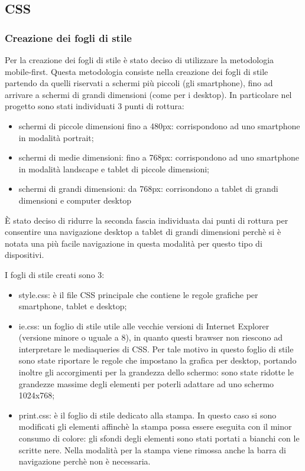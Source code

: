 \subsection{CSS}
\subsubsection{Creazione dei fogli di stile}

Per la creazione dei fogli di stile è stato deciso di utilizzare la metodologia mobile-first.
Questa metodologia consiste nella creazione dei fogli di stile partendo da quelli riservati a schermi più piccoli (gli smartphone), fino ad arrivare a schermi di grandi dimensioni (come per i desktop).
In particolare nel progetto sono stati individuati 3 punti di rottura:
\begin{itemize}

    \item schermi di piccole dimensioni fino a 480px: corrispondono ad uno smartphone in modalità portrait;
    \item schermi di medie dimensioni: fino a 768px: corrispondono ad uno smartphone in modalità landscape e tablet di piccole dimensioni;
    \item schermi di grandi dimensioni: da 768px: corrisondono a tablet di grandi dimensioni e computer desktop

\end{itemize}

\`E stato deciso di ridurre la seconda fascia individuata dai punti di rottura per consentire una navigazione desktop a tablet di grandi dimensioni perchè si è notata una più facile navigazione in questa modalità per questo tipo di dispositivi.

I fogli di stile creati sono 3:
\begin{itemize}

    \item style.css: è il file CSS principale che contiene le regole grafiche per smartphone, tablet e desktop;
    \item ie.css:  un foglio di stile utile alle vecchie versioni di Internet Explorer (versione minore o uguale a 8), in quanto questi brawser non riescono ad interpretare le mediaqueries di CSS. Per tale motivo in questo foglio di stile sono state riportare le regole che impostano la grafica per desktop, portando inoltre gli accorgimenti per la grandezza dello schermo: sono state ridotte le grandezze massime degli elementi per poterli adattare ad uno schermo 1024x768;
    \item print.css: è il foglio di stile dedicato alla stampa. In questo caso si sono modificati gli elementi affinchè la stampa possa essere eseguita con il minor consumo di colore: gli sfondi degli elementi sono stati portati a bianchi con le scritte nere. Nella modalità per la stampa viene rimossa anche la barra di navigazione perchè non è necessaria.

\end{itemize}


